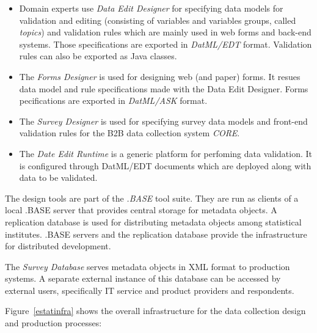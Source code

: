 \begin{itemize}

\item
Domain experts use \textit{Data Edit Designer} for specifying data models for validation and editing (consisting of variables and variables groups, called \textit{topics}) and validation rules which are mainly used in web forms and back-end systems. Those specifications are exported in \textit{DatML/EDT} format. Validation rules can also be exported as Java classes.

\item
The \textit{Forms Designer} is used for designing web (and paper) forms. It resues data model and rule specifications made with the Data Edit Designer. Forms pecifications are exported in \textit{DatML/ASK} format.

\item
The \textit{Survey Designer} is used for specifying survey data models and front-end validation rules for the B2B data collection system \textit{CORE}.

\item
The \textit{Date Edit Runtime} is a generic platform for perfoming data validation. It is configured through DatML/EDT documents which are deployed along with data to be validated.

\end{itemize}

The design tools are part of the \textit{.BASE} tool suite. They are run as clients of a local .BASE server that provides central storage for metadata objects. A replication database is used for distributing metadata objects among statistical institutes. .BASE servers and the replication database provide the infrastructure for distributed development.

The \textit{Survey Database} serves metadata objects in XML format to production systems. A separate external instance of this database can be accessed by external users, specifically IT service and product providers and respondents.

Figure~\ref{estatinfra} shows the overall infrastructure for the data collection design and production processes:


